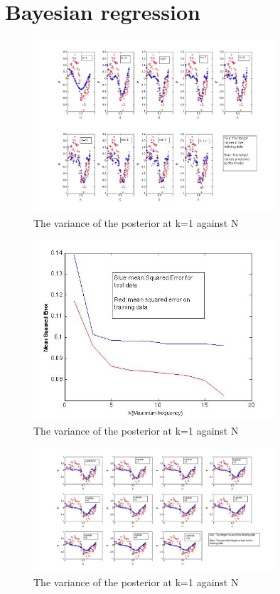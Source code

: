 \documentclass[14pt]{report}
\begin{document}
\section{Bayesian regression}
\begin{figure}[h!]
  \caption{The variance of the posterior at k=1 against N }
  \centering
    \includegraphics[width=0.8\textwidth]{4A.jpg}
\end{figure}
\begin{figure}[h!]
  \caption{The variance of the posterior at k=1 against N }
  \centering
    \includegraphics[width=0.8\textwidth]{4b.jpg}
\end{figure}
\begin{figure}[h!]
  \caption{The variance of the posterior at k=1 against N }
  \centering
    \includegraphics[width=0.8\textwidth]{4C.jpg}
\end{figure}
\end{document}

